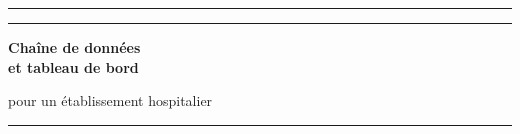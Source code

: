 \begin{titlepage}
\setlength{\parskip}{0pt}
\centering

\hfill\siBrouillon{\fbox{\footnotesize\mentionVersionDeTravail}}\par
\vspace*{4mm}

\logosInstitutionnels

\vspace{10mm}

\siRenseigne{\marqueurEtablissementFormation}{%
  {\large\scshape \etablissementDeveloppe\par}\vspace{2mm}%
}
\siRenseigne{\marqueurFiliere}{%
  {\normalsize\itshape\color{griscartouche} \marqueurFiliere\par}%
}

\vspace{5mm}
{\color{accentgarde}\rule{\linewidth}{0.8pt}}

\vspace{13mm}

{\LARGE\scshape\color{accentgarde}\par}

\vspace{7mm}

{\color{accentgarde}\rule{0.62\linewidth}{1.5pt}}\par
\vspace{8mm}
{\Huge\bfseries Chaîne de données\\[3mm] et tableau de bord\par}
\vspace{5mm}
{\large pour un établissement hospitalier\par}
\vspace{8mm}
{\color{accentgarde}\rule{0.62\linewidth}{1.5pt}}


\end{titlepage}

